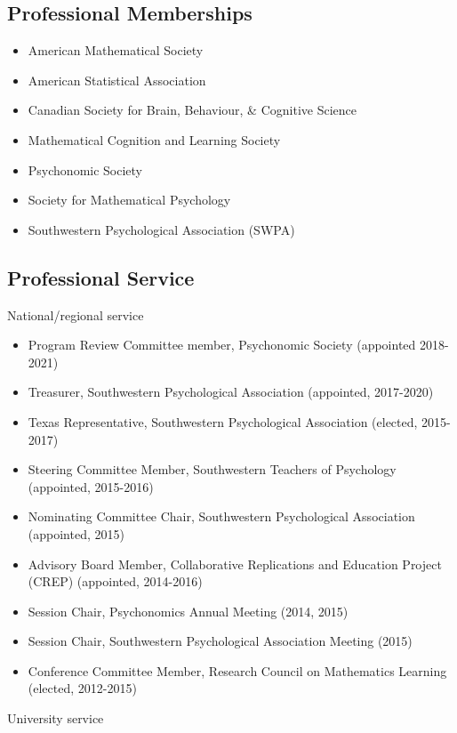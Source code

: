 \documentclass[article,10pt]{article}
\begin{document}
\subsection*{Professional Memberships}
\label{sec:org42d2478}
\begin{itemize}
\item American Mathematical Society
\item American Statistical Association
\item Canadian Society for Brain, Behaviour, \& Cognitive Science
\item Mathematical Cognition and Learning Society
\item Psychonomic Society
\item Society for Mathematical Psychology
\item Southwestern Psychological Association (SWPA)
\end{itemize}

\subsection*{Professional Service}
\label{sec:orgb02098f}

National/regional service 

\begin{itemize}
\item Program Review Committee member, Psychonomic Society (appointed 2018-2021)
\item Treasurer, Southwestern Psychological Association (appointed, 2017-2020)
\item Texas Representative, Southwestern Psychological Association (elected, 2015-2017)
\item Steering Committee Member, Southwestern Teachers of Psychology (appointed, 2015-2016)
\item Nominating Committee Chair, Southwestern Psychological Association (appointed, 2015)
\item Advisory Board Member, Collaborative Replications and Education Project (CREP) (appointed, 2014-2016)
\item Session Chair, Psychonomics Annual Meeting (2014, 2015)
\item Session Chair, Southwestern Psychological Association Meeting (2015)
\item Conference Committee Member, Research Council on Mathematics Learning (elected, 2012-2015)
\end{itemize}

University service
\end{document}
